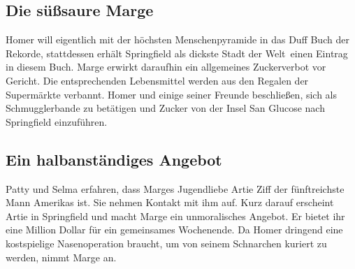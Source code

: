\subsection{Die süßsaure Marge}\label{DABF03}
Homer will eigentlich mit der höchsten Menschenpyramide in das Duff Buch der Rekorde, stattdessen erhält Springfield als \glqq dickste Stadt der Welt\grqq\ einen Eintrag in diesem Buch. Marge erwirkt daraufhin ein allgemeines Zuckerverbot vor Gericht. Die entsprechenden Lebensmittel werden aus den Regalen der Supermärkte verbannt. Homer und einige seiner Freunde beschließen, sich als Schmugglerbande zu betätigen und Zucker von der Insel San Glucose nach Springfield einzuführen.


\subsection{Ein halbanständiges Angebot}
Patty und Selma erfahren, dass Marges Jugendliebe Artie Ziff der fünftreichste Mann Amerikas ist. Sie nehmen Kontakt mit ihm auf. Kurz darauf erscheint Artie in Springfield und macht Marge ein unmoralisches Angebot. Er bietet ihr eine Million Dollar für ein gemeinsames Wochenende. Da Homer dringend eine kostspielige Nasenoperation braucht, um von seinem Schnarchen kuriert zu werden, nimmt Marge an.

